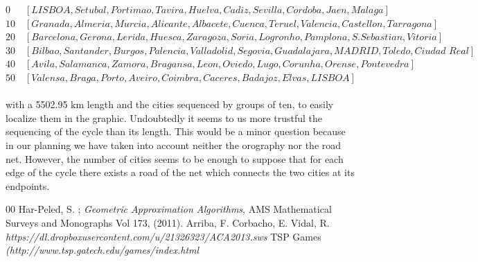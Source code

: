 \documentclass[a4paper]{article} %
\begin{document}
{\small $0\quad \,\,\,[ LISBOA, Setubal, Portimao, Tavira, Huelva, Cadiz, Sevilla, Cordoba, Jaen,  Malaga]$\\
$10\quad [ Granada, Almeria, Murcia, Alicante, Albacete, Cuenca, Teruel, Valencia, Castellon, Tarragona ]$\\
$20\quad [ Barcelona, Gerona, Lerida, Huesca, Zaragoza, Soria, Logronho, Pamplona, S.Sebastian, Vitoria ]$\\
$30\quad [ Bilbao, Santander, Burgos, Palencia, Valladolid, Segovia, Guadalajara, MADRID, Toledo, Ciudad\, \,Real ]$\\
$40\quad [ Avila, Salamanca, Zamora, Bragansa, Leon, Oviedo, Lugo, Corunha, Orense, Pontevedra ]$\\
$50\quad [Valensa, Braga, Porto, Aveiro, Coimbra, Caceres, Badajoz, Elvas, LISBOA ]$}\\\\
with a 5502.95 km length and the cities sequenced by groups of ten, to easily localize them in the graphic. Undoubtedly it seems to us more trustful the sequencing of the cycle than its length. This would be a minor question because in our planning we have taken into account neither the orography nor the road net. However, the number of cities seems to be enough to suppose that for each edge of the cycle there exists a road of the net which connects the two cities at its endpoints.
\begin{thebibliography}{00}
 Har-Peled, S. ; \textit{ Geometric Approximation Algorithms}, AMS Mathematical Surveys and Monographs Vol 173,  (2011).
 Arriba, F. Corbacho, E. Vidal, R. \textit{https://dl.dropboxusercontent.com/u/21326323/ACA2013.sws}
 TSP Games \textit{(http://www.tsp.gatech.edu/games/index.html}
\end{thebibliography}
\end{document}
